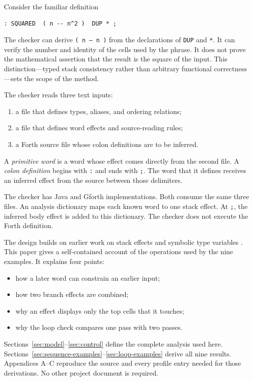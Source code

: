 \documentclass[11pt,a4paper]{article}
\newcommand{\effect}[1]{\mbox{\texttt{#1}}}
\begin{document}
Consider the familiar definition
\begin{verbatim}
: SQUARED  ( n -- n^2 )  DUP * ;
\end{verbatim}
The checker can derive \effect{( n -- n )} from the declarations of
\texttt{DUP} and \texttt{*}.  It can verify the number and identity of the
cells used by the phrase.  It does not prove the mathematical assertion that
the result is the square of the input.  This distinction---typed stack
consistency rather than arbitrary functional correctness---sets the scope of
the method.

\begin{samepage}
The checker reads three text inputs:
\begin{enumerate}
  \item a file that defines types, aliases, and ordering relations;
  \item a file that defines word effects and source-reading rules;
  \item a Forth source file whose colon definitions are to be inferred.
\end{enumerate}
A \emph{primitive word} is a word whose effect comes directly from the second
file.  A \emph{colon definition} begins with \texttt{:} and ends with
\texttt{;}.  The word that it defines receives an inferred effect from the
source between those delimiters.
\end{samepage}
The checker has Java and Gforth implementations.  Both consume the same three
files.  An analysis dictionary maps each known word to one stack effect.  At
\texttt{;}, the inferred body effect is added to this dictionary.  The checker
does not execute the Forth definition.

The design builds on earlier work on stack effects and symbolic type variables
\cite{poial1994,poial1992,poial2002,poial2006,poial2008}.  This paper gives a
self-contained account of the operations used by the nine examples.  It
explains four points:
\begin{itemize}
  \item how a later word can constrain an earlier input;
  \item how two branch effects are combined;
  \item why an effect displays only the top cells that it touches;
  \item why the loop check compares one pass with two passes.
\end{itemize}
Sections~\ref{sec:model}--\ref{sec:control} define the complete analysis used
here.  Sections~\ref{sec:sequence-examples}--\ref{sec:loop-examples} derive all
nine results.  Appendices A--C reproduce the source and every profile entry
needed for those derivations.  No other project document is required.
\end{document}
